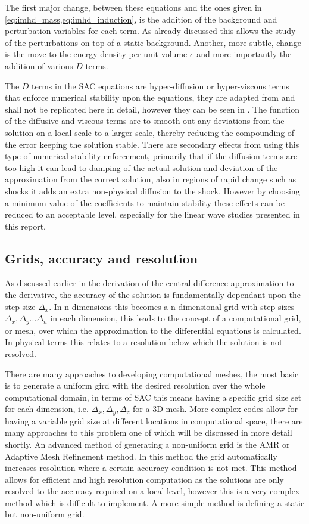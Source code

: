 The first major change, between these equations and the ones given in \cref{eq:imhd_mass,eq:imhd_induction}, is the addition of the background and perturbation variables for each term.
As already discussed this allows the study of the perturbations on top of a static background.
Another, more subtle, change is the move to the energy density per-unit volume $e$ and more importantly the addition of various $D$ terms.

The $D$ terms in the SAC equations are hyper-diffusion or hyper-viscous terms that enforce numerical stability upon the equations, they are adapted from \citep{nordlund1995} and shall not be replicated here in detail, however they can be seen in \citet{shelyag2008}.
The function of the diffusive and viscous terms are to smooth out any deviations from the solution on a local scale to a larger scale, thereby reducing the compounding of the error keeping the solution stable.
There are secondary effects from using this type of numerical stability enforcement, primarily that if the diffusion terms are too high it can lead to damping of the actual solution and deviation of the approximation from the correct solution, also in regions of rapid change such as shocks it adds an extra non-physical diffusion to the shock.
However by choosing a minimum value of the coefficients to maintain stability these effects can be reduced to an acceptable level, especially for the linear wave studies presented in this report.


\subsection{Grids, accuracy and resolution}

As discussed earlier in the derivation of the central difference approximation to the derivative, the accuracy of the solution is fundamentally dependant upon the step size $\Delta_{x}$.
In n dimensions this becomes a n dimensional grid with step sizes $\Delta_{x},\Delta_{y}...\Delta_{n}$ in each dimension, this leads to the concept of a computational grid, or mesh, over which the approximation to the differential equations is calculated.
In physical terms this relates to a resolution below which the solution is not resolved.

There are many approaches to developing computational meshes, the most basic is to generate a uniform gird with the desired resolution over the whole computational domain, in terms of SAC this means having a specific grid size set for each dimension, i.e. $\Delta_{x},\Delta_{y},\Delta_{z}$ for a 3D mesh.
More complex codes allow for having a variable grid size at different locations in computational space, there are many approaches to this problem one of which will be discussed in more detail shortly.
An advanced method of generating a non-uniform grid is the AMR or Adaptive Mesh Refinement method.
In this method the grid automatically increases resolution where a certain accuracy condition is not met.
This method allows for efficient and high resolution computation as the solutions are only resolved to the accuracy required on a local level, however this is a very complex method which is difficult to implement.
A more simple method is defining a static but non-uniform grid.

